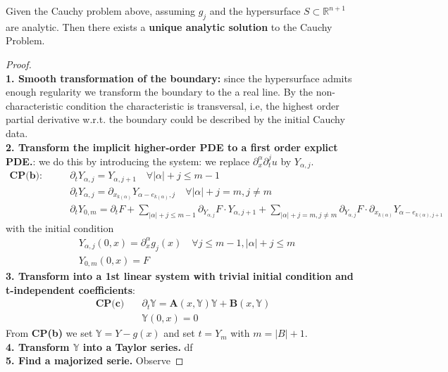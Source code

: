\begin{theorem}
	Given the Cauchy problem above, assuming $g_j$ and the hypersurface $S \subset \mathbb{R}^{n + 1}$ are analytic. Then there exists a \textbf{unique analytic solution} to the Cauchy Problem.
\end{theorem}
\begin{proof}\quad\\
\textbf{1. Smooth transformation of the boundary:} since the hypersurface admits enough regularity we transform the boundary to the a real line. By the non-characteristic condition the characteristic is transversal, i.e,  the highest order partial derivative w.r.t. the boundary could be described by the initial Cauchy data. \\
\textbf{2. Transform the implicit higher-order PDE to a first order explict PDE.}: we do this by introducing the system: we replace $\partial_x^\alpha \partial_t^j u$ by $Y_{\alpha, j}$. 
\begin{align*} \textbf{CP(b):} \qquad
 	&\partial_t Y_{\alpha, j} = Y_{\alpha, j+1} \quad \forall |\alpha| + j \leq m - 1 \\
 	&\partial_t Y_{\alpha, j} = \partial_{x_{k(\alpha)}} Y_{\alpha - e_{k(\alpha)}, j} \quad \forall  |\alpha| + j = m, j \neq m \\
 	& \partial_t Y_{0, m} = \partial_t F + \sum_{|\alpha| + j \le m -1 }  \partial_{Y_{\alpha, j}} F \cdot  Y_{\alpha, j + 1} + \sum_{|\alpha| + j = m, j \neq m} \partial_{Y_{\alpha, j}} F \cdot  \partial_{x_{k(\alpha)}} Y_{ \alpha - e_{k(\alpha), j + 1}}
\end{align*}
with the initial condition
\begin{align*}
	 &Y_{\alpha, j}(0, x) = \partial^\alpha_x g_j(x) \quad \forall j \le m - 1, |\alpha|  + j \le m \\
	 &Y_{0, m}(0, x) = F \quad 
\end{align*}
\textbf{3. Transform into a 1st linear system with trivial initial condition and t-independent coefficients}:
\begin{align*}
\textbf{CP(c)} \quad
	&\partial_t \mathbb{Y} = \pmb{A}(x, \mathbb{Y}) \mathbb{Y} + \pmb{B}(x, \mathbb{Y}) \\
	&\mathbb{Y}(0, x) = 0
\end{align*}
From \textbf{CP(b)} we set $\mathbb{Y} = Y - g(x)$ and set $t = Y_m$ with $m = |B| + 1$. \\
\textbf{4. Transform $\mathbb{Y}$ into a Taylor series.}
df
\\
\textbf{5. Find a majorized serie.} Observe
\end{proof}



